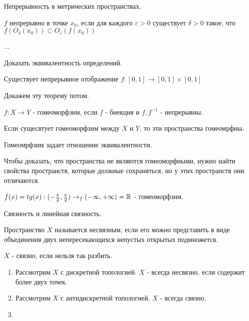 Непрерывность в метрических пространствах.

\begin{definition}[По Коши]
    $f$ непрерывно в точке $x_0$, если для каждого $\varepsilon > 0$ существует $\delta > 0$ такое, что $f(O_{\delta}(x_0)) \subset O_{\varepsilon}(f(x_0))$
\end{definition}
\begin{definition}[По Гейне]
    ...
\end{definition}

\begin{exercise}
    Доказать эквивалентность определений.
\end{exercise}

\begin{theorem}
    Существует непрерывное отображение $f: [0, 1] \rightarrow [0, 1] \times [0, 1]$
\end{theorem}
Докажем эту теорему потом.

\begin{definition}
    $f: X \rightarrow Y$ - гомеоморфзим, если $f$ - биекция и $f, f^{-1}$ - непрерывны.

    Если сущесвтует гомеоморфзим между $X$ и $Y$, то эти пространства гомеомрфны.
\end{definition}

\begin{nota_bene}
    Гомеомрфзим задает отношение эквивалентности.

    Чтобы доказать, что пространства не являются гомеоморфными, нужно найти свойства пространств, которые должные сохраняться, но у этих пространств они отличаются. 
\end{nota_bene}

\begin{example}
    $f(x) = tg(x) : (-\frac{\pi}{2}, \frac{\pi}{2}) \rightarrow_f (-\infty, +\infty) = \mathbb{R}$ - гомеоморфзим.  
\end{example}

Связность и линейная связность.

\begin{definition}
    Пространство $X$ называется несвязным, если его можно представить в виде объединения двух непересекающихся непустых открытых подмножетсв.

    $X$ - связно, если нельзя так разбить.
\end{definition}

\begin{example}
    \begin{enumerate}
        \item Рассмотрим $X$ с дискретной топологией. $X$ - всегда несвязно, если содержит более двух точек.
        \item Рассмотрим $X$ с антидискретной топологией. $X$ - всегда связно.
        \item 
    \end{enumerate}
\end{example}

